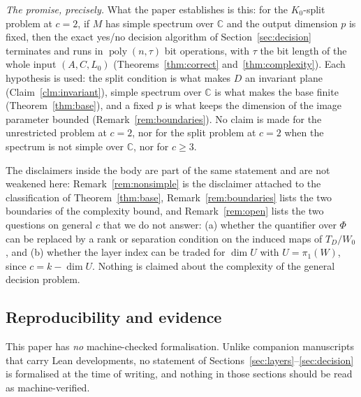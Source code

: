 \documentclass[journal]{IEEEtran}
\theoremstyle{plainn}
\theoremstyle{remark}
\newcommand{\poly}{\operatorname{poly}}
\begin{document}
\emph{The promise, precisely.} What the paper establishes is this: for the $K_0$-split problem at $c=2$,
if $M$ has simple spectrum over $\mathbb C$ and the output dimension $p$ is fixed, then the exact yes/no
decision algorithm of Section~\ref{sec:decision} terminates and runs in $\poly(n,\tau)$ bit operations,
with $\tau$ the bit length of the whole input $(A,C,L_0)$ (Theorems~\ref{thm:correct}
and~\ref{thm:complexity}). Each hypothesis is used: the split condition is what makes $D$ an invariant
plane (Claim~\ref{clm:invariant}), simple spectrum over $\mathbb C$ is what makes the base finite
(Theorem~\ref{thm:base}), and a fixed $p$ is what keeps the dimension of the image parameter bounded
(Remark~\ref{rem:boundaries}). No claim is made for the unrestricted problem at $c=2$, nor for the split
problem at $c=2$ when the spectrum is not simple over $\mathbb C$, nor for $c\ge3$.

The disclaimers inside the body are part of the same statement and are not weakened here:
Remark~\ref{rem:nonsimple} is the disclaimer attached to the classification of
Theorem~\ref{thm:base}, Remark~\ref{rem:boundaries} lists the two boundaries of the complexity bound, and
Remark~\ref{rem:open} lists the two questions on general $c$ that we do not answer: (a) whether the
quantifier over $\Phi$ can be replaced by a rank or separation condition on the induced maps of
$T_D/W_0$, and (b) whether the layer index can be traded for $\dim U$ with $U=\pi_1(W)$, since
$c=k-\dim U$. Nothing is claimed about the complexity of the general decision problem.

\subsection{Reproducibility and evidence}\label{sec:conclusion:evidence}

This paper has \emph{no} machine-checked formalisation. Unlike companion manuscripts that carry Lean
developments, no statement of Sections~\ref{sec:layers}--\ref{sec:decision} is formalised at the time of
writing, and nothing in those sections should be read as machine-verified.
\end{document}
